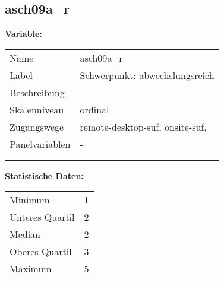 	
	
	\subsection{asch09a\_r}
	\label{subSection:asch09a_r}

	\noindent\textbf{Variable:}\\
		\begin{tabular}{lL{11.3cm}}
			\label{tableVariable:asch09a_r}
			Name & asch09a\_r \\
			Label & Schwerpunkt: abwechslungsreich \\
			Beschreibung & - \\
			Skalenniveau & ordinal \\
			Zugangswege &
				remote-desktop-suf,
				onsite-suf,
 \\
			Panelvariablen & -
			 \\
			 \\
 \\
		\end{tabular}



		\vspace*{1 cm}
		\noindent\textbf{Statistische Daten:}\\
			\begin{tabular}{ll}
				\label{tableStatistics:asch09a_r}
					Minimum & 1 \\
					Unteres Quartil & 2 \\
					Median & 2 \\
					Oberes Quartil & 3 \\
					Maximum & 5 \\
			\end{tabular}



